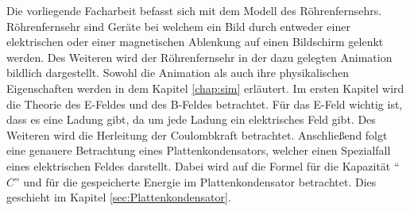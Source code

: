 Die vorliegende Facharbeit befasst sich mit dem Modell des Röhrenfernsehrs.
Röhrenfernsehr sind Geräte bei welchem ein Bild durch entweder einer elektrischen oder einer magnetischen Ablenkung auf einen Bildschirm gelenkt werden.
Des Weiteren wird der Röhrenfernsehr in der dazu gelegten Animation bildlich dargestellt.
Sowohl die Animation als auch ihre physikalischen Eigenschaften werden in dem Kapitel \ref{chap:sim} erläutert.
Im ersten Kapitel wird die Theorie des E-Feldes und des B-Feldes betrachtet.
Für das E-Feld wichtig ist, dass es eine Ladung gibt, da um jede Ladung ein elektrisches Feld gibt.
Des Weiteren wird die Herleitung der Coulombkraft betrachtet.
Anschließend folgt eine genauere Betrachtung eines Plattenkondensators, welcher einen Spezialfall eines elektrischen Feldes darstellt.
Dabei wird auf die Formel für die Kapazität "`$C$"' und für die gespeicherte Energie im Plattenkondensator betrachtet.
Dies geschieht im Kapitel \ref{sec:Plattenkondensator}.
